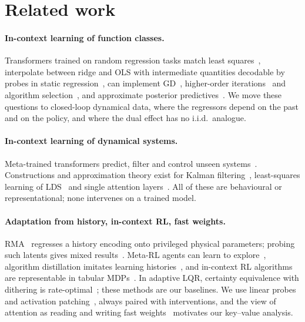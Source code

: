\section{Related work}

\paragraph{In-context learning of function classes.} Transformers trained on random regression tasks match least
squares~\citep{garg2022what}, interpolate between ridge and OLS with intermediate quantities decodable by probes in
static regression~\citep{akyurek2022learning}, can implement GD~\citep{vonoswald2023transformers,ahn2023transformers,zhang2023trained},
higher-order iterations~\citep{fu2023transformers} and algorithm selection~\citep{bai2023transformers}, and approximate
posterior predictives~\citep{muller2022transformers,raventos2023pretraining}. We move these questions to closed-loop
dynamical data, where the regressors depend on the past and on the policy, and where the dual effect has no i.i.d.\ analogue.

\paragraph{In-context learning of dynamical systems.} Meta-trained transformers predict, filter and control unseen
systems~\citep{forgione2023from,piga2023adaptation,busetto2023incontext,balim2023can,akram2026transformers,busetto2024one}.
Constructions and approximation theory exist for Kalman filtering~\citep{goel2024can}, least-squares learning of
LDS~\citep{cole2025incontext} and single attention layers~\citep{vladarean2026learning}. All of these are behavioural or
representational; none intervenes on a trained model.

\paragraph{Adaptation from history, in-context RL, fast weights.} RMA~\citep{kumar2021rma} regresses a history encoding
onto privileged physical parameters; probing such latents gives mixed results~\citep{chamachot2026evaluating,zhang2026interpreting}.
Meta-RL agents can learn to explore~\citep{duan2016rl2,zintgraf2020varibad}, algorithm distillation imitates learning
histories~\citep{laskin2022incontext}, and in-context RL algorithms are representable in tabular
MDPs~\citep{liang2026transformers}. In adaptive LQR, certainty equivalence with dithering is
rate-optimal~\citep{mania2019certainty,simchowitz2020naive}; these methods are our baselines. We use linear
probes~\citep{alain2016understanding} and activation patching~\citep{zhang2024towards,heimersheim2024how}, always
paired with interventions, and the view of attention as reading and writing fast
weights~\citep{ba2016using,schlag2021linear,dai2023why} motivates our key--value analysis.
